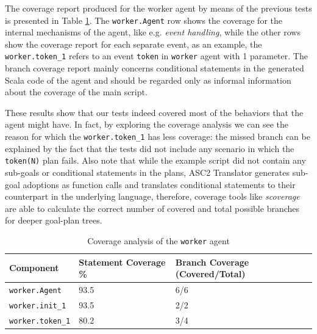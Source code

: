 The coverage report produced for the worker agent by means of the previous tests is presented in Table \ref{tab:coverage}. The \texttt{worker.Agent} row shows the coverage for the internal mechanisms of the agent, like e.g. \textit{event handling}, 
while the other rows show the coverage report for each separate event, as an example, the \texttt{worker.token\_1} refers to an event \texttt{token} in \texttt{worker} agent with 1 parameter. The branch coverage report mainly concerns conditional statements in the generated Scala code of the agent and should be regarded only as informal information about the coverage of the main script.

These results show that our tests indeed covered most of the behaviors that the agent might have. In fact, by exploring the coverage analysis we can see the reason for which the \texttt{worker.token\_1} has less coverage: the missed branch can be explained by the fact that the tests did not include any scenario in which the \texttt{token(N)} plan fails. Also note that while the example script did not contain any sub-goals or conditional statements in the plans, ASC2 Translator generates sub-goal adoptions as function calls and translates conditional statements to their counterpart in the underlying language, therefore, coverage tools like \textit{scoverage} are able to calculate the correct number of covered and total possible branches for deeper goal-plan trees.
\vspace{-5pt}

\setlength{\tabcolsep}{0.5em} %
{\renewcommand{\arraystretch}{1.1}%
\begin{table}
    \centering
    \begin{tabular}{lll}
        \toprule
        Component &  Statement Coverage \% & Branch Coverage (Covered/Total) \\
        \midrule
       \texttt{worker.Agent}  &  93.5  & 6/6 \\
       \texttt{worker.init\_1} &  93.5  & 2/2 \\
       \texttt{worker.token\_1} &  80.2  & 3/4 \\ \bottomrule
    \end{tabular}
    \vspace{5pt}
    \caption{Coverage analysis of the \texttt{worker} agent}
    \label{tab:coverage}
    \vspace{-10pt}
\end{table}
}

